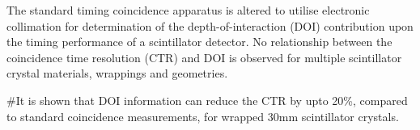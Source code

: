 The standard timing coincidence apparatus is altered to utilise electronic collimation for determination of the depth-of-interaction (DOI) contribution upon the timing performance of a scintillator detector. No relationship between the coincidence time resolution (CTR) and DOI is observed for multiple scintillator crystal materials, wrappings and geometries. 

#It is shown that DOI information can reduce the CTR by upto 20\%, compared to standard coincidence measurements, for wrapped 30mm scintillator crystals.